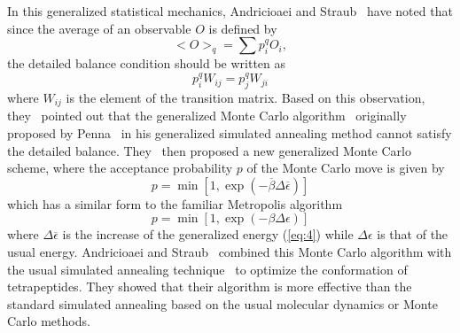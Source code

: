 In this generalized statistical mechanics, Andricioaei and
Straub~\cite{AS1} have noted that since the average of an
observable $O$ is defined by
\begin{equation}
<O>_{q}=\sum p_{i}^{q}O_{i},
\label{eq:6}
\end{equation}
the detailed balance condition should be written as
\begin{equation}
p_{i}^{q}W_{ij}=p_{j}^{q}W_{ji}
\label{equation}
\end{equation}
where $W_{ij}$ is the element of the transition matrix. Based
on this observation, they~\cite{AS1} pointed out that the
generalized Monte Carlo algorithm~\cite{TS} originally proposed
by Penna~\cite{Pe} in his generalized simulated annealing method
cannot satisfy the detailed balance. They~\cite{AS1} then
proposed a new generalized Monte Carlo scheme, where the
acceptance probability $p$ of the Monte Carlo move is given by
\begin{equation}
p=\min\left[1,\exp(-\overline{\beta}\Delta \overline{\epsilon})\right]
\label{eq:7}
\end{equation}
which has a similar form to the familiar Metropolis
algorithm~\cite{MRRTT}
\begin{equation}
p=\min\left[1,\exp(-\beta\Delta \epsilon)\right] \label{eq:8}
\end{equation}
where $\Delta\overline{\epsilon}$ is the increase of the
generalized energy (\ref{eq:4}) while $\Delta\epsilon$ is that
of the usual energy. Andricioaei and Straub~\cite{AS1} combined
this Monte Carlo algorithm with the usual simulated annealing
technique~\cite{KGV} to optimize the conformation of tetrapeptides.
They showed that their algorithm is more effective than the
standard simulated annealing based on the usual molecular
dynamics or Monte Carlo methods.

